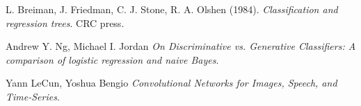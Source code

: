 \begin{thebibliography}{999}

L. Breiman, J. Friedman, C. J. Stone, R. A. Olshen (1984).
\textit{Classification and regression trees}.
CRC press.

Andrew Y. Ng, Michael I. Jordan  
\textit{On Discriminative vs. Generative Classifiers: A comparison of logistic regression and naive Bayes}.

Yann LeCun, Yoshua Bengio
\textit{Convolutional Networks for Images, Speech, and Time-Series}.


\end{thebibliography}
